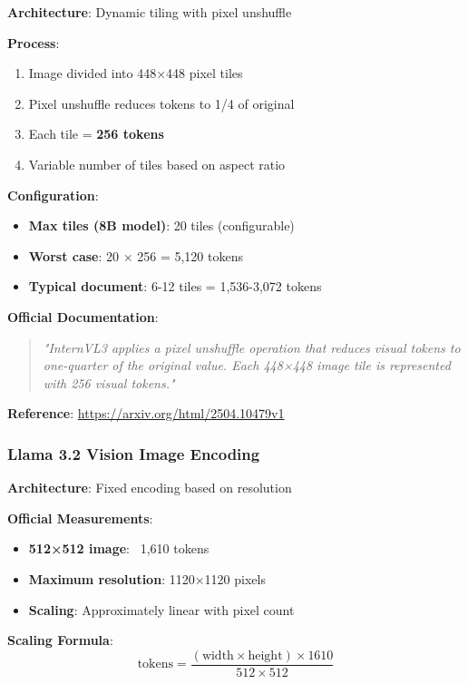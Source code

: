 \documentclass[11pt,a4paper]{article}
\begin{document}
\textbf{Architecture}: Dynamic tiling with pixel unshuffle

\textbf{Process}:
\begin{enumerate}[leftmargin=*]
    \item Image divided into 448×448 pixel tiles
    \item Pixel unshuffle reduces tokens to 1/4 of original
    \item Each tile = \textbf{256 tokens}
    \item Variable number of tiles based on aspect ratio
\end{enumerate}

\textbf{Configuration}:
\begin{itemize}[leftmargin=*]
    \item \textbf{Max tiles (8B model)}: 20 tiles (configurable)
    \item \textbf{Worst case}: 20 × 256 = 5,120 tokens
    \item \textbf{Typical document}: 6-12 tiles = 1,536-3,072 tokens
\end{itemize}

\textbf{Official Documentation}:
\begin{quote}
\textit{"InternVL3 applies a pixel unshuffle operation that reduces visual tokens to one-quarter of the original value. Each 448×448 image tile is represented with 256 visual tokens."}
\end{quote}

\textbf{Reference}: \url{https://arxiv.org/html/2504.10479v1}

\subsubsection{Llama 3.2 Vision Image Encoding}

\textbf{Architecture}: Fixed encoding based on resolution

\textbf{Official Measurements}:
\begin{itemize}[leftmargin=*]
    \item \textbf{512×512 image}: ~1,610 tokens
    \item \textbf{Maximum resolution}: 1120×1120 pixels
    \item \textbf{Scaling}: Approximately linear with pixel count
\end{itemize}

\textbf{Scaling Formula}:
\begin{equation}
\text{tokens} = \frac{(\text{width} \times \text{height}) \times 1610}{512 \times 512}
\end{equation}
\end{document}

